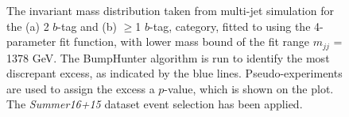 \begin{figure}[!ht]
  \begin{center}
    \captionsetup[subfigure]{aboveskip=0pt,justification=centering}
  \end{center}
  \caption{ The invariant mass distribution taken from multi-jet simulation for the (a) 2 $b$-tag and (b) $\geq$1 $b$-tag,
    category, fitted to using the 4-parameter fit function, with lower mass bound of the fit range $m_{jj}$ = 1378 GeV.
    The BumpHunter algorithm is run to identify the most discrepant excess, as indicated by the blue lines.
    Pseudo-experiments are used to assign the excess a $p$-value, which is shown on the plot. 
    The \textit{Summer16+15} dataset event selection has been applied.}
  \label{fig:Short_4para_1378_figure1}
\end{figure}




